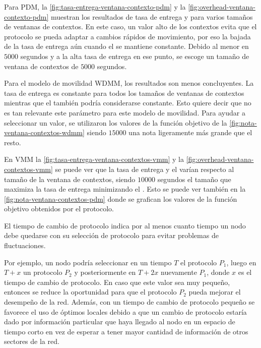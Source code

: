 Para PDM, la \ref{fig:tasa-entrega-ventana-contexto-pdm} y la
\ref{fig:overhead-ventana-contexto-pdm} muestran los resultados de tasa de
entrega y \overhead{} para varios tamaños de ventanas de contextos. En este
caso, un valor alto de los contextos evita que el protocolo se pueda adaptar a
cambios rápidos de movimiento, por eso la bajada de la tasa de entrega aún
cuando el \overhead{} se mantiene constante. Debido al \overhead{} menor en
$5000$ segundos y a la alta tasa de entrega en ese punto, se escoge un tamaño de
ventana de contextos de $5000$ segundos.


Para el modelo de movilidad WDMM, los resultados son menos concluyentes. La tasa
de entrega es constante para todos los tamaños de ventanas de contextos mientras
que el \overhead{} también podría considerarse constante. Esto quiere decir que
no es tan relevante este parámetro para este modelo de movilidad. Para ayudar a
seleccionar un valor, se utilizaron los valores de la función objetivo de la 
\ref{fig:nota-ventana-contextos-wdmm} siendo $15000$ una nota ligeramente más
grande que el resto.


En VMM la \ref{fig:tasa-entrega-ventana-contextos-vmm} y la
\ref{fig:overhead-ventana-contextos-vmm} se puede ver que la tasa de entrega y
el \overhead{} varían respecto al tamaño de la ventana de contextos, siendo
$10000$ segundos el tamaño que maximiza la tasa de entrega minimizando el
\overhead. Esto se puede ver también en la \ref{fig:nota-ventana-contextos-pdm}
donde se grafican los valores de la función objetivo obtenidos por el protocolo. 







El tiempo de cambio de protocolo indica por al menos cuanto tiempo un nodo
debe quedarse con su selección de protocolo para evitar problemas de
fluctuaciones. 

Por ejemplo, un nodo podría seleccionar en un tiempo $T$ el protocolo $P_1$,
luego en $T + x$ un protocolo $P_2$ y posteriormente en $T + 2x$ nuevamente
$P_1$, donde $x$ es el tiempo de cambio de protocolo. En caso que este valor sea
muy pequeño, entonces se reduce la oportunidad para que el protocolo $P_2$ pueda
mejorar el desempeño de la red. Además, con un tiempo de cambio de protocolo
pequeño se favorece el uso de óptimos locales debido a que un cambio de
protocolo estaría dado por información particular que haya llegado al nodo en un
espacio de tiempo corto en vez de esperar a tener mayor cantidad de información
de otros sectores de la red.

